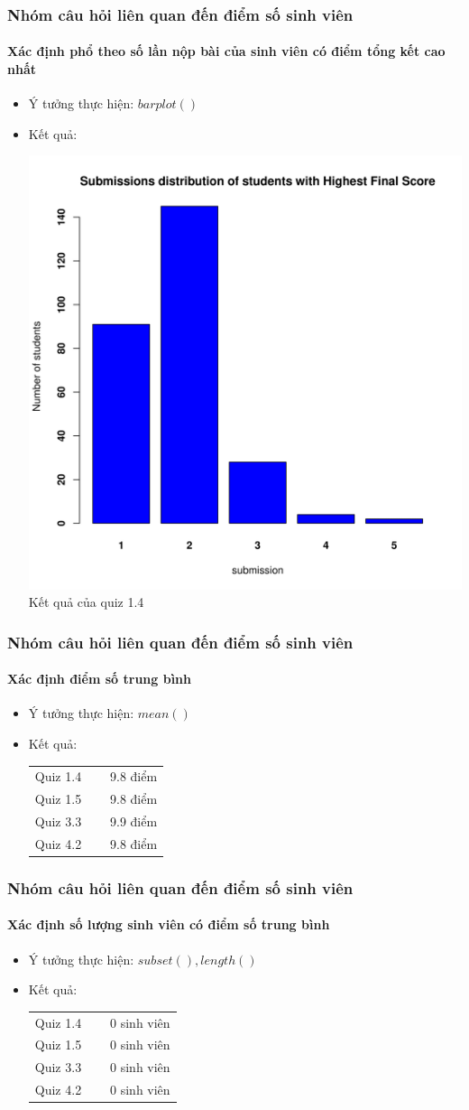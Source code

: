 \documentclass[english,10pt,table]{beamer}
\begin{document}
\frame
{
\frametitle{Nhóm câu hỏi liên quan đến điểm số sinh viên}
\framesubtitle{Xác định phổ theo số lần nộp bài của sinh viên có điểm tổng kết cao nhất}
\begin{itemize}
    \item Ý tưởng thực hiện: $barplot()$
    \item Kết quả:\\
    \begin{center}
        \includegraphics[width = 6 cm]{Images/img2-4-1.png}\\
        Kết quả của quiz 1.4
    \end{center}
\end{itemize}
}

\frame
{
\frametitle{Nhóm câu hỏi liên quan đến điểm số sinh viên}
\framesubtitle{Xác định điểm số trung bình}
\begin{itemize}
    \item Ý tưởng thực hiện: $mean()$
    \item Kết quả:\\
    \begin{center}
        \begin{tabular}{l l r}
             Quiz 1.4 & $\;$ & 9.8 điểm\\
             Quiz 1.5 & $\;$ & 9.8 điểm\\
             Quiz 3.3 & $\;$ & 9.9 điểm\\
             Quiz 4.2 & $\;$ & 9.8 điểm
        \end{tabular}
    \end{center}
\end{itemize}
}

\frame
{
\frametitle{Nhóm câu hỏi liên quan đến điểm số sinh viên}
\framesubtitle{Xác định số lượng sinh viên có điểm số trung bình}
\begin{itemize}
    \item Ý tưởng thực hiện: $subset(), length()$
    \item Kết quả:\\
    \begin{center}
        \begin{tabular}{l l r}
             Quiz 1.4 & $\;$ & 0 sinh viên\\
             Quiz 1.5 & $\;$ & 0 sinh viên\\
             Quiz 3.3 & $\;$ & 0 sinh viên\\
             Quiz 4.2 & $\;$ & 0 sinh viên
        \end{tabular}
    \end{center}
\end{itemize}
}
\end{document}
